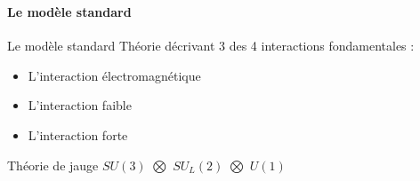 \documentclass[8pt]{beamer}
\begin{document}
  \begin{frame}
  \frametitle{\secname}
  \framesubtitle{Le modèle standard}
    \begin{minipage}{0.6\linewidth}
      \begin{block}{Le modèle standard}
        Théorie décrivant 3 des 4 interactions fondamentales :
        \begin{itemize}
          \item L'interaction électromagnétique
          \item L'interaction faible
          \item L'interaction forte
        \end{itemize}
        Théorie de jauge $SU(3)$ $\bigotimes$ $SU_{L}(2)$ $\bigotimes$ $U(1)$
      \end{block}
      ~
    \end{minipage} \hfill
    \begin{minipage}{0.38\linewidth}
    \end{minipage}
    \begin{minipage}{0.46\linewidth}
      \begin{center}
\end{center}
\end{minipage}
\end{frame}
\end{document}
